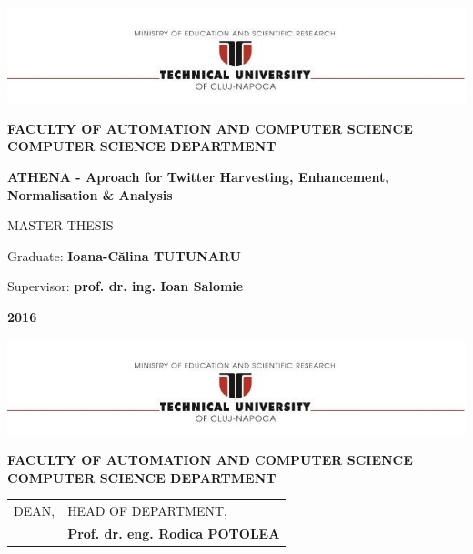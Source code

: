 \documentclass[12pt,a4paper,twoside]{report}
\renewcommand{\thesisyear}{2016}      %
\renewcommand{\thesistitle}{ATHENA - Aproach for Twitter Harvesting, Enhancement, Normalisation \& Analysis}
\renewcommand{\thesissupervisor}{prof. dr. ing. Ioan Salomie}
\newcommand{\department}{\bf FACULTY OF AUTOMATION AND COMPUTER SCIENCE\\
COMPUTER SCIENCE DEPARTMENT}
\newcommand{\utcnlogo}{\includegraphics[width=15cm]{img/tucn.jpg}}
\begin{document}

\newenvironment{definition}[1][Definition]{\begin{trivlist}
\item[\hskip \labelsep {\bfseries #1}]}{\end{trivlist}}




\setcounter{page}{4}



\begin{center}
\utcnlogo

\department

\vspace{4cm}

{\bf \thesistitle} %

\vspace{1.5cm}

MASTER THESIS

\vspace{5cm}

Graduate: {\bf Ioana-C\u{a}lina TUTUNARU} 

Supervisor: {\bf \thesissupervisor}

\vspace{3cm}
{\bf \thesisyear}
\end{center}

\thispagestyle{empty}
\newpage

\begin{center}
\utcnlogo

\department

\end{center}
\vspace{0.5cm}

\begin{tabular}{p{7cm}p{8cm}}
 \hspace{-1cm}DEAN, & HEAD OF DEPARTMENT,\\
\hspace{-1cm}{\bf Prof. dr. eng. Liviu MICLEA} & {\bf Prof. dr. eng. Rodica POTOLEA}\\  
\end{tabular}
 
\end{document}
